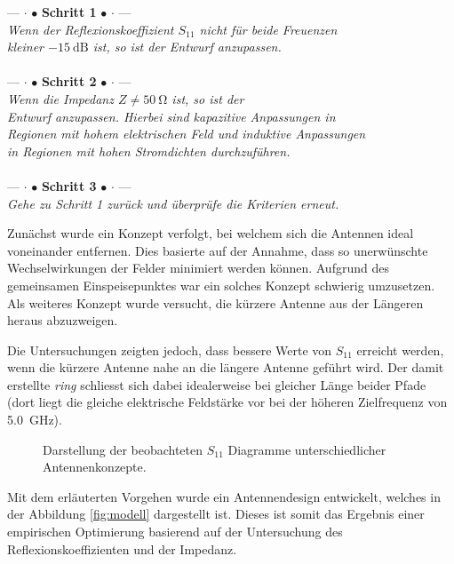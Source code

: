 \begin{center}
	--- $\cdot$ $\bullet$ \textbf{Schritt 1} $\bullet$ $\cdot$ --- \\
	\emph{
		Wenn der Reflexionskoeffizient $S_{11}$ nicht für beide Freuenzen \\
		kleiner $\SI{-15}{\dB}$ ist, so ist der Entwurf anzupassen.} \\ ~ \\
	--- $\cdot$ $\bullet$ \textbf{Schritt 2} $\bullet$ $\cdot$ --- \\
	\emph{
		Wenn die Impedanz $Z \neq \SI{50}{\ohm}$ ist, so ist der \\
		Entwurf anzupassen. Hierbei sind kapazitive Anpassungen in \\
		Regionen mit hohem elektrischen Feld und induktive Anpassungen \\
		in Regionen mit hohen Stromdichten durchzuführen.} \\ ~ \\
	--- $\cdot$ $\bullet$ \textbf{Schritt 3} $\bullet$ $\cdot$ --- \\
	\emph{
		Gehe zu Schritt 1 zurück und überprüfe die Kriterien erneut.}
\end{center}

Zunächst wurde ein Konzept verfolgt, bei welchem sich die Antennen
ideal voneinander entfernen. Dies basierte auf der Annahme, dass so unerwünschte
Wechselwirkungen der Felder minimiert werden können. Aufgrund des gemeinsamen
Einspeisepunktes war ein solches Konzept schwierig umzusetzen. Als weiteres
Konzept wurde versucht, die kürzere Antenne aus der Längeren heraus
abzuzweigen.

Die Untersuchungen zeigten jedoch, dass bessere Werte von $S_{11}$
erreicht werden, wenn die kürzere Antenne nahe an die längere Antenne
geführt wird. Der damit erstellte \emph{ring} schliesst sich dabei
idealerweise bei gleicher Länge beider Pfade (dort liegt die gleiche
elektrische Feldstärke vor bei der höheren Zielfrequenz von
\SI{5.0}{\giga\hertz}).

\begin{figure}[h!]
	\centering
	\footnotesize
	\def\svgscale{0.75}
	
	\caption{Darstellung der beobachteten $S_{11}$ Diagramme unterschiedlicher Antennenkonzepte.}
	\label{fig:antenna_concept_1}
\end{figure}

Mit dem erläuterten Vorgehen wurde ein Antennendesign entwickelt,
welches in der Abbildung \ref{fig:modell} dargestellt ist. Dieses ist
somit das Ergebnis einer empirischen Optimierung basierend auf der
Untersuchung des Reflexionskoeffizienten und der Impedanz.

